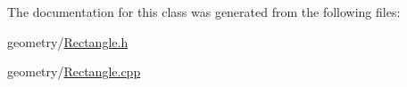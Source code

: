 The documentation for this class was generated from the following files\+:\begin{DoxyCompactItemize}
\item 
geometry/\hyperlink{Rectangle_8h}{Rectangle.\+h}\item 
geometry/\hyperlink{Rectangle_8cpp}{Rectangle.\+cpp}\end{DoxyCompactItemize}
